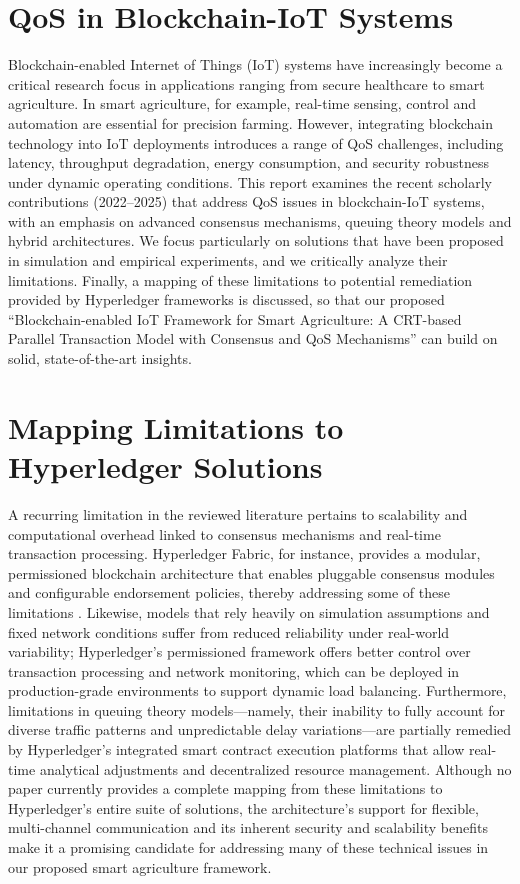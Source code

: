 \documentclass[12pt,onecolumn]{IEEEtran} %
\begin{document}
\section*{QoS in Blockchain-IoT Systems}
Blockchain-enabled Internet of Things (IoT) systems have increasingly become a critical research focus in applications ranging from secure healthcare to smart agriculture. In smart agriculture, for example, real-time sensing, control and automation are essential for precision farming. However, integrating blockchain technology into IoT deployments introduces a range of QoS challenges, including latency, throughput degradation, energy consumption, and security robustness under dynamic operating conditions. This report examines the recent scholarly contributions (2022--2025) that address QoS issues in blockchain-IoT systems, with an emphasis on advanced consensus mechanisms, queuing theory models and hybrid architectures. We focus particularly on solutions that have been proposed in simulation and empirical experiments, and we critically analyze their limitations. Finally, a mapping of these limitations to potential remediation provided by Hyperledger frameworks is discussed, so that our proposed ``Blockchain-enabled IoT Framework for Smart Agriculture: A CRT-based Parallel Transaction Model with Consensus and QoS Mechanisms'' can build on solid, state-of-the-art insights.

\section*{Mapping Limitations to Hyperledger Solutions}
A recurring limitation in the reviewed literature pertains to scalability and computational overhead linked to consensus mechanisms and real-time transaction processing. Hyperledger Fabric, for instance, provides a modular, permissioned blockchain architecture that enables pluggable consensus modules and configurable endorsement policies, thereby addressing some of these limitations \cite{pajooh2022experimentalperformanceanalysis}. Likewise, models that rely heavily on simulation assumptions and fixed network conditions suffer from reduced reliability under real-world variability; Hyperledger's permissioned framework offers better control over transaction processing and network monitoring, which can be deployed in production-grade environments to support dynamic load balancing. Furthermore, limitations in queuing theory models---namely, their inability to fully account for diverse traffic patterns and unpredictable delay variations---are partially remedied by Hyperledger's integrated smart contract execution platforms that allow real-time analytical adjustments and decentralized resource management. Although no paper currently provides a complete mapping from these limitations to Hyperledger's entire suite of solutions, the architecture's support for flexible, multi-channel communication and its inherent security and scalability benefits make it a promising candidate for addressing many of these technical issues in our proposed smart agriculture framework.
\end{document}
